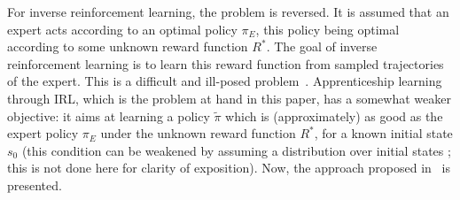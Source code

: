 \documentclass{jfpda2011}
\begin{document}
For inverse reinforcement learning, the problem is reversed. It is
assumed that an expert acts according to an optimal policy $\pi_E$,
this policy being optimal according to some unknown reward function
$R^*$. The goal of inverse reinforcement learning is to learn this
reward function from sampled trajectories of the expert. This is a
difficult and ill-posed problem~\citep{ng2000algorithms}. Apprenticeship
learning through IRL, which is the problem at hand in this paper,
has a somewhat weaker objective: it aims at learning a policy
$\tilde{\pi}$ which is (approximately) as good as the expert policy
$\pi_E$ under the unknown reward function $R^*$, for a known initial
state $s_0$ (this condition can be weakened by assuming a
distribution over initial states ; this is not done here for clarity
of exposition). Now, the approach proposed in~\citep{abbeel2004apprenticeship} is
presented.
\end{document}
